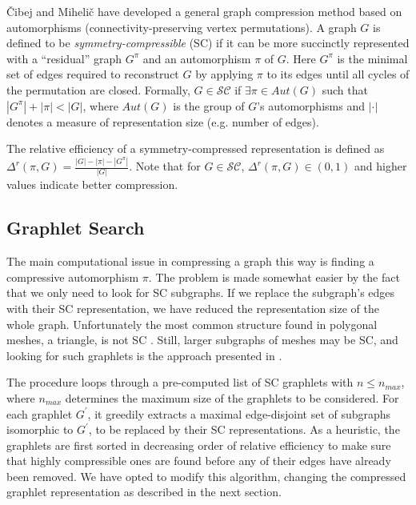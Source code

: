 \documentclass{egpubl}
\begin{document}
Čibej and Mihelič \cite{cibej2021automorphisms} have developed a general graph compression method based on automorphisms (connectivity-preserving vertex permutations).
A graph $G$ is defined to be \textit{symmetry-compressible} (SC)
if it can be more succinctly represented with a ``residual'' graph $G^\pi$ and an automorphism  $\pi$ of $G$. Here $G^\pi$ is the minimal set of edges required to reconstruct $G$ by applying $\pi$ to its edges until all cycles of the permutation are closed.
Formally, $G \in \mathcal{S}\mathcal{C}$ if $\exists \pi \in Aut(G)$ such that $|G^\pi| + |\pi| < |G|$, where $Aut(G)$ is the group of $G$'s automorphisms and $|\cdot|$ denotes a measure of representation size (e.g. number of edges). 

The relative efficiency of a symmetry-compressed representation is defined as
$\Delta^r(\pi, G) = \frac{|G| - |\pi| - |G^\pi|}{|G|}$.
Note that for $G \in \mathcal{S}\mathcal{C}$, $\Delta^r(\pi, G) \in (0, 1)$ and higher values indicate better compression.


\subsection{Graphlet Search} \label{sec:graphlet}

The main computational issue in compressing a graph this way is finding a compressive automorphism $\pi$.
The problem is made somewhat easier by the fact that we only need to look for SC subgraphs. If we replace the subgraph's edges with their SC representation, we have reduced the representation size of the whole graph. 
Unfortunately the most common structure found in polygonal meshes, a triangle, is not SC \cite[Theorem 3]{cibej2021automorphisms}. Still, larger subgraphs of meshes may be SC, and looking for such graphlets is the approach presented in \cite[Algorithm 1]{cibej2021automorphisms}.

The procedure loops through a pre-computed list of SC graphlets with $n \leq n_{max}$, where $n_{max}$ determines the maximum size of the graphlets to be considered. 
For each graphlet $G^\prime$, it greedily extracts a maximal edge-disjoint set of subgraphs isomorphic to $G^\prime$, to be replaced by their SC representations.
As a heuristic, the graphlets are first sorted in decreasing order of relative efficiency to make sure that highly compressible ones are found before any of their edges have already been removed. We have opted to modify this algorithm, changing the compressed graphlet representation as described in the next section.
\end{document}
